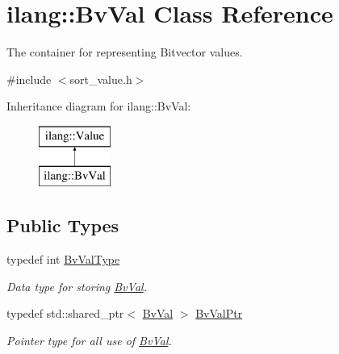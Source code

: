 \hypertarget{classilang_1_1_bv_val}{}\section{ilang\+:\+:Bv\+Val Class Reference}
\label{classilang_1_1_bv_val}


The container for representing Bitvector values.  




{\ttfamily \#include $<$sort\+\_\+value.\+h$>$}

Inheritance diagram for ilang\+:\+:Bv\+Val\+:\begin{figure}[H]
\begin{center}
\leavevmode
\includegraphics[height=2.000000cm]{classilang_1_1_bv_val}
\end{center}
\end{figure}
\subsection*{Public Types}
\begin{DoxyCompactItemize}
\item 
\mbox{\label{classilang_1_1_bv_val_a880f2d0a32113b4cc4f5faa05e3c3b4a}} 
typedef int \mbox{\hyperlink{classilang_1_1_bv_val_a880f2d0a32113b4cc4f5faa05e3c3b4a}{Bv\+Val\+Type}}
\begin{DoxyCompactList}\small\item\em Data type for storing \mbox{\hyperlink{classilang_1_1_bv_val}{Bv\+Val}}. \end{DoxyCompactList}\item 
\mbox{\label{classilang_1_1_bv_val_a07cd315cb7e6d40ec7fef2b00989b074}} 
typedef std\+::shared\+\_\+ptr$<$ \mbox{\hyperlink{classilang_1_1_bv_val}{Bv\+Val}} $>$ \mbox{\hyperlink{classilang_1_1_bv_val_a07cd315cb7e6d40ec7fef2b00989b074}{Bv\+Val\+Ptr}}
\begin{DoxyCompactList}\small\item\em Pointer type for all use of \mbox{\hyperlink{classilang_1_1_bv_val}{Bv\+Val}}. \end{DoxyCompactList}\end{DoxyCompactItemize}
